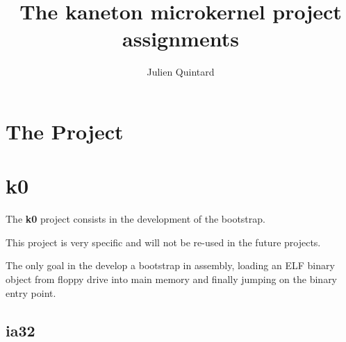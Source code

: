 
%
%



%
%


%
%

\title{The kaneton microkernel project assignments}

%
%

\author{\small{Julien Quintard}}

%
%



%
%

\maketitle

%
%

%
%

\section{The Project}

%
%

\section{k0}

The \textbf{k0} project consists in the development of the bootstrap.

This project is very specific and will not be re-used in the future
projects.

The only goal in the develop a bootstrap in assembly, loading an ELF
binary object from floppy drive into main memory and finally jumping
on the binary entry point.

%
%

\subsection{ia32}

